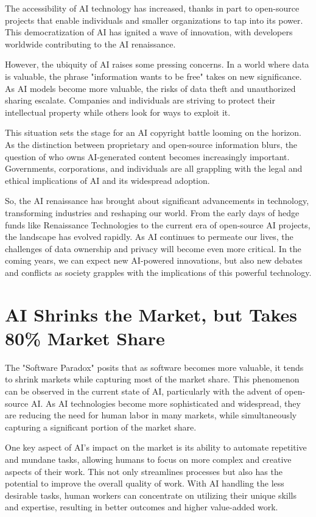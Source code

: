 The accessibility of AI technology has increased, thanks in part to open-source projects that enable individuals and smaller organizations to tap into its power. This democratization of AI has ignited a wave of innovation, with developers worldwide contributing to the AI renaissance.

However, the ubiquity of AI raises some pressing concerns. In a world where data is valuable, the phrase "information wants to be free" takes on new significance. As AI models become more valuable, the risks of data theft and unauthorized sharing escalate. Companies and individuals are striving to protect their intellectual property while others look for ways to exploit it.

This situation sets the stage for an AI copyright battle looming on the horizon. As the distinction between proprietary and open-source information blurs, the question of who owns AI-generated content becomes increasingly important. Governments, corporations, and individuals are all grappling with the legal and ethical implications of AI and its widespread adoption.

So, the AI renaissance has brought about significant advancements in technology, transforming industries and reshaping our world. From the early days of hedge funds like Renaissance Technologies to the current era of open-source AI projects, the landscape has evolved rapidly. As AI continues to permeate our lives, the challenges of data ownership and privacy will become even more critical. In the coming years, we can expect new AI-powered innovations, but also new debates and conflicts as society grapples with the implications of this powerful technology.


\section{AI Shrinks the Market, but Takes 80\% Market Share}

The "Software Paradox" posits that as software becomes more valuable, it tends to shrink markets while capturing most of the market share. This phenomenon can be observed in the current state of AI, particularly with the advent of open-source AI. As AI technologies become more sophisticated and widespread, they are reducing the need for human labor in many markets, while simultaneously capturing a significant portion of the market share.

One key aspect of AI's impact on the market is its ability to automate repetitive and mundane tasks, allowing humans to focus on more complex and creative aspects of their work. This not only streamlines processes but also has the potential to improve the overall quality of work. With AI handling the less desirable tasks, human workers can concentrate on utilizing their unique skills and expertise, resulting in better outcomes and higher value-added work.

